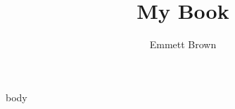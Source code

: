 \documentclass{gitbook}
\title{My Book}
\author{Emmett Brown}
\begin{document}
\maketitle
\tableofcontents
\newpage

{body}

\printindex
\end{document}
